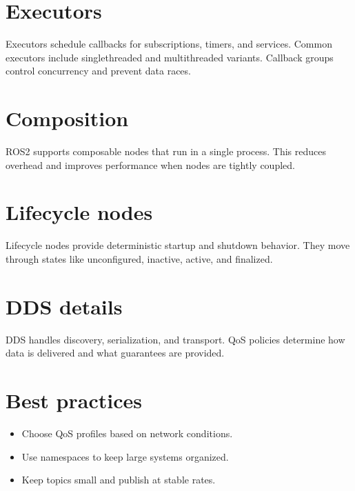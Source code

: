 \documentclass[letterpaper,10pt,english]{sphinxmanual}
\begin{document}
\section{Executors}
\label{\detokenize{appendix_g_ros2_architecture:executors}}
\sphinxAtStartPar
Executors schedule callbacks for subscriptions, timers, and services. Common
executors include single\sphinxhyphen{}threaded and multi\sphinxhyphen{}threaded variants. Callback groups
control concurrency and prevent data races.


\section{Composition}
\label{\detokenize{appendix_g_ros2_architecture:composition}}
\sphinxAtStartPar
ROS2 supports composable nodes that run in a single process. This reduces
overhead and improves performance when nodes are tightly coupled.


\section{Lifecycle nodes}
\label{\detokenize{appendix_g_ros2_architecture:lifecycle-nodes}}
\sphinxAtStartPar
Lifecycle nodes provide deterministic startup and shutdown behavior. They move
through states like unconfigured, inactive, active, and finalized.


\section{DDS details}
\label{\detokenize{appendix_g_ros2_architecture:dds-details}}
\sphinxAtStartPar
DDS handles discovery, serialization, and transport. QoS policies determine how
data is delivered and what guarantees are provided.


\section{Best practices}
\label{\detokenize{appendix_g_ros2_architecture:best-practices}}\begin{itemize}
\item {} 
\sphinxAtStartPar
Choose QoS profiles based on network conditions.

\item {} 
\sphinxAtStartPar
Use namespaces to keep large systems organized.

\item {} 
\sphinxAtStartPar
Keep topics small and publish at stable rates.

\end{itemize}
\end{document}
